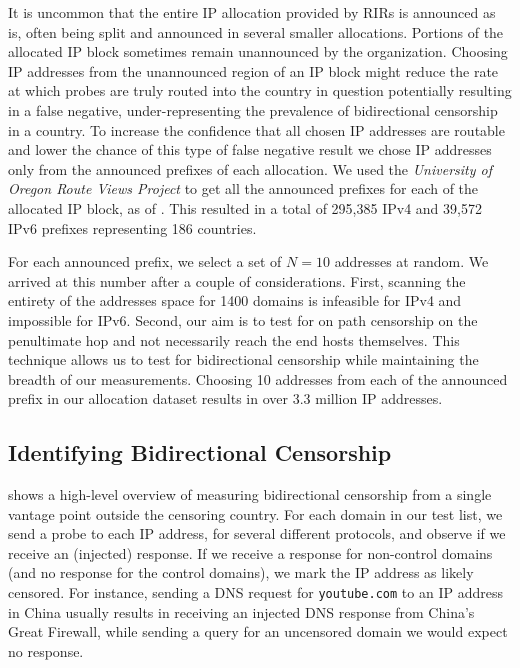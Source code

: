 It is uncommon that the entire IP allocation provided by RIRs is announced as
is, often being split and announced in several smaller allocations. Portions of
the allocated IP block sometimes remain unannounced by the organization.
Choosing IP addresses from the unannounced region of an IP block might reduce
the rate at which probes are truly routed into the country in question
potentially resulting in a false negative, under-representing the prevalence of
bidirectional censorship in a country. To increase the confidence that all
chosen IP addresses are routable and lower the chance of this type of false
negative result we chose IP addresses only from the announced prefixes of each
allocation. We used the \textit{University of Oregon Route Views Project}
\cite{RouteVie20:online} to get all the announced prefixes for each of the
allocated IP block, as of . This resulted
in a total of 295,385 IPv4 and 39,572 IPv6 prefixes representing 186 countries.


For each announced prefix, we select a set of $N=10$ addresses at random. We
arrived at this number after a couple of considerations. First, scanning the
entirety of the addresses space for 1400 domains is infeasible for IPv4 and
impossible for IPv6. Second, our aim is to test for on path censorship on the
penultimate hop and not necessarily reach the end hosts themselves. This
technique allows us to test for bidirectional censorship while maintaining the
breadth of our measurements. Choosing 10 addresses from each of the announced
prefix in our allocation dataset results in over 3.3 million IP addresses.

\subsection{Identifying Bidirectional Censorship}
\label{sec:methodology:censorship}


\textbf{} shows a high-level overview of measuring
bidirectional censorship from a single vantage point outside the censoring
country. For each domain in our test list, we send a probe to each IP address,
for several different protocols, and observe if we receive an (injected)
response. If we receive a response for non-control domains (and no response for
the control domains), we mark the IP address as likely censored. For instance,
sending a DNS request for \texttt{youtube.com} to an IP address in China usually
results in receiving an injected DNS response from China's Great Firewall, while
sending a query for an uncensored domain we would expect no response.

